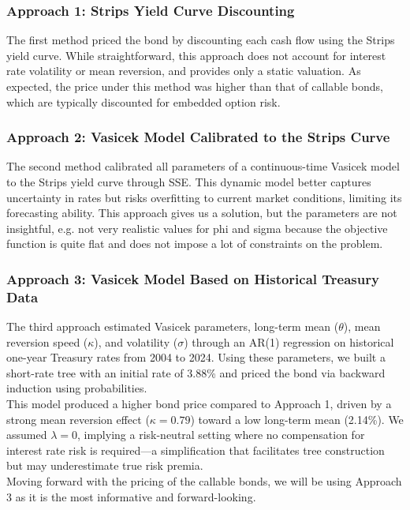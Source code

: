 \documentclass{article}
\begin{document}
\subsubsection{Approach 1: Strips Yield Curve Discounting}
The first method priced the bond by discounting each cash flow using the Strips yield curve. While straightforward, this approach does not account for interest rate volatility or mean reversion, and provides only a static valuation. As expected, the price under this method was higher than that of callable bonds, which are typically discounted for embedded option risk. \\

\subsubsection{Approach 2: Vasicek Model Calibrated to the Strips Curve}
The second method calibrated all parameters of a continuous-time Vasicek model to the Strips yield curve through SSE. This dynamic model better captures uncertainty in rates but risks overfitting to current market conditions, limiting its forecasting ability. This approach gives us a solution, but the parameters are not insightful, e.g. not very realistic values for phi and sigma because the objective function is quite flat and does not impose a lot of constraints on the problem. 

\subsubsection{Approach 3: Vasicek Model Based on Historical Treasury Data}
The third approach estimated Vasicek parameters, long-term mean ($\theta$), mean reversion speed ($\kappa$), and volatility ($\sigma$) through an AR(1) regression on historical one-year Treasury rates from 2004 to 2024. Using these parameters, we built a short-rate tree with an initial rate of 3.88\% and priced the bond via backward induction using probabilities. \\

This model produced a higher bond price compared to Approach 1, driven by a strong mean reversion effect ($\kappa = 0.79$) toward a low long-term mean (2.14\%). We assumed $\lambda = 0$, implying a risk-neutral setting where no compensation for interest rate risk is required—a simplification that facilitates tree construction but may underestimate true risk premia. \\

Moving forward with the pricing of the callable bonds, we will be using Approach 3 as it is the most informative and forward-looking. 
\end{document}
